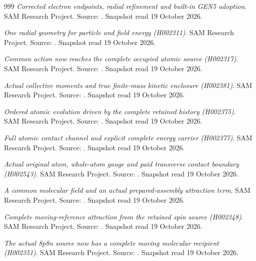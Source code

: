 \begin{thebibliography}{999}
 \emph{Corrected electron endpoints, radial refinement and built-in GEN5 adoption}. SAM Research Project. Source: . Snapshot read 19 October 2026.

 \emph{One radial geometry for particle and field energy (H002311)}. SAM Research Project. Source: . Snapshot read 19 October 2026.

 \emph{Common action now reaches the complete occupied atomic source (H002317)}. SAM Research Project. Source: . Snapshot read 19 October 2026.

 \emph{Actual collective moments and true finite-mass kinetic enclosure (H002381)}. SAM Research Project. Source: . Snapshot read 19 October 2026.

 \emph{Ordered atomic evolution driven by the complete retained history (H002375)}. SAM Research Project. Source: . Snapshot read 19 October 2026.

 \emph{Full atomic contact channel and explicit complete energy carrier (H002377)}. SAM Research Project. Source: . Snapshot read 19 October 2026.

 \emph{Actual original atom, whole-atom gauge and paid transverse contact boundary (H002543)}. SAM Research Project. Source: . Snapshot read 19 October 2026.

 \emph{A common molecular field and an actual prepared-assembly attraction term}. SAM Research Project. Source: . Snapshot read 19 October 2026.

 \emph{Complete moving-reference attraction from the retained spin source (H002348)}. SAM Research Project. Source: . Snapshot read 19 October 2026.

 \emph{The actual 8p8n source now has a complete moving molecular recipient (H002351)}. SAM Research Project. Source: . Snapshot read 19 October 2026.


\end{thebibliography}
